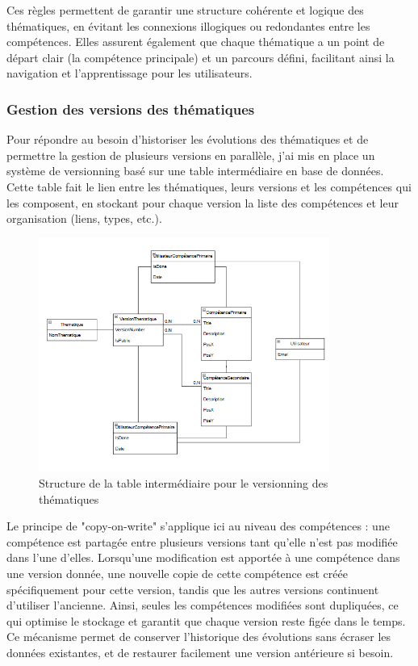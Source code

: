 \documentclass[12pt]{article}
\begin{document}
\vspace{0.5cm}
\noindent
Ces règles permettent de garantir une structure cohérente et logique des thématiques, en évitant les connexions illogiques ou redondantes entre les compétences. Elles assurent également que chaque thématique a un point de départ clair (la compétence principale) et un parcours défini, facilitant ainsi la navigation et l'apprentissage pour les utilisateurs.

\subsubsection{Gestion des versions des thématiques}
Pour répondre au besoin d’historiser les évolutions des thématiques et de permettre la gestion de plusieurs versions en parallèle, j’ai mis en place un système de versionning basé sur une table intermédiaire en base de données. Cette table fait le lien entre les thématiques, leurs versions et les compétences qui les composent, en stockant pour chaque version la liste des compétences et leur organisation (liens, types, etc.).
\begin{figure}[H]
  \centering
  \includegraphics[width=0.85\textwidth]{img/bdd-version.png}
  \caption{Structure de la table intermédiaire pour le versionning des thématiques}
\end{figure}
Le principe de "copy-on-write" s’applique ici au niveau des compétences : une compétence est partagée entre plusieurs versions tant qu’elle n’est pas modifiée dans l'une d'elles. Lorsqu’une modification est apportée à une compétence dans une version donnée, une nouvelle copie de cette compétence est créée spécifiquement pour cette version, tandis que les autres versions continuent d’utiliser l’ancienne. Ainsi, seules les compétences modifiées sont dupliquées, ce qui optimise le stockage et garantit que chaque version reste figée dans le temps. Ce mécanisme permet de conserver l’historique des évolutions sans écraser les données existantes, et de restaurer facilement une version antérieure si besoin.
\end{document}
